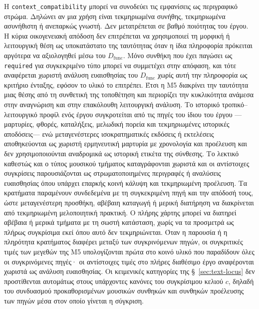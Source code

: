 \documentclass[11pt,a4paper]{article}
\begin{document}
Η \texttt{context\_compatibility} μπορεί να συνοδεύει τις εμφανίσεις ως περιγραφικό στρώμα. Δηλώνει αν μια χρήση είναι τεκμηριωμένα συνήθης, τεκμηριωμένα ασυνήθιστη ή ανεπαρκώς γνωστή. Δεν μετατρέπεται σε βαθμό ποιότητας του έργου. Η κύρια οικογενειακή απόδοση δεν επιτρέπεται να χρησιμοποιεί τη μορφική ή λειτουργική θέση ως υποκατάστατο της ταυτότητας όταν η ίδια πληροφορία πρόκειται αργότερα να αξιολογηθεί μέσω του $D_{\mathrm{func}}$. Μόνο συνθήκη που έχει παγώσει ως \texttt{required} για συγκεκριμένο τύπο μπορεί να συμμετέχει στην απόφαση, και τότε αναφέρεται χωριστή ανάλυση ευαισθησίας του $D_{\mathrm{func}}$ χωρίς αυτή την πληροφορία ως κριτήριο ένταξης, εφόσον το υλικό το επιτρέπει. Έτσι η M5 διακρίνει την ταυτότητα μιας θέσης από τη συνθετική της τοποθέτηση και περιορίζει την κυκλικότητα ανάμεσα στην αναγνώριση και στην επακόλουθη λειτουργική ανάλυση. Το ιστορικό τροπικό--λειτουργικό προφίλ ενός έργου συγκροτείται από τις πηγές του ίδιου του έργου ---μαρτυρίες, φθορές, καταλήξεις, μελωδική πορεία και τεκμηριωμένες ιστορικές αποδόσεις--- ενώ μεταγενέστερες ισοκρατηματικές εκδόσεις ή εκτελέσεις αποθηκεύονται ως χωριστή ερμηνευτική μαρτυρία με χρονολογία και προέλευση και δεν χρησιμοποιούνται αναδρομικά ως ιστορική ετικέτα της σύνθεσης. Το λεκτικό καθεστώς και ο τύπος μουσικού τμήματος καταγράφονται χωριστά και οι αντίστοιχες συγκρίσεις παρουσιάζονται ως στρωματοποιημένες περιγραφές ή αναλύσεις ευαισθησίας όπου υπάρχει επαρκής κοινή κάλυψη και τεκμηριωμένη προέλευση. Τα κρατήματα παραμένουν συνδεδεμένα με τη συγκεκριμένη πηγή και την απόδοσή τους, ώστε μεταγενέστερη προσθήκη, αβέβαιη καταγωγή ή μερική διατήρηση να διακρίνεται από τεκμηριωμένη μελοποιητική πρακτική. Ο πλήρης χάρτης μπορεί να διατηρεί αβέβαια ή μερικά τμήματα με τη σωστή κατάσταση, χωρίς να τα προσμετρά ως πλήρως συγκρίσιμα εκεί όπου αυτό δεν τεκμηριώνεται. Όταν η παρουσία ή η πληρότητα κρατήματος διαφέρει μεταξύ των συγκρινόμενων πηγών, οι συγκριτικές τιμές των μεγεθών της M5 υπολογίζονται πρώτα στο κοινό υλικό που παραδίδουν όλες οι συγκρινόμενες πηγές· οι αντίστοιχες τιμές στο πλήρες διαθέσιμο έργο αναφέρονται χωριστά ως ανάλυση ευαισθησίας. Οι κειμενικές κατηγορίες της §~\ref{sec:text-locus} δεν προστίθενται αυτομάτως στους υπάρχοντες κανόνες του συγκρίσιμου κελιού $c$, δηλαδή του συνδυασμού προκαθορισμένων μουσικών συνθηκών και συνθηκών προέλευσης των πηγών μέσα στον οποίο γίνεται η σύγκριση.
\end{document}

